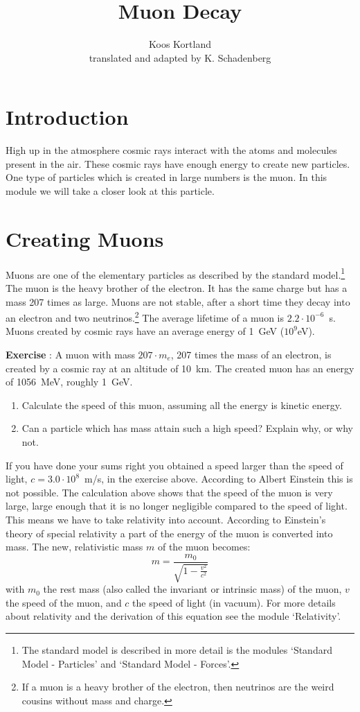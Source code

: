 \documentclass[12pt,a4paper]{article}
\author{Koos Kortland \\ translated and adapted by K. Schadenberg}
\date{}
\title{Muon Decay}
\numberwithin{equation}{section}
\numberwithin{figure}{section}
\newcounter{Exercise}
\numberwithin{table}{section}
\begin{document}
\maketitle

\section{Introduction}
High up in the atmosphere cosmic rays interact with the atoms and molecules present in the air. These cosmic rays have enough energy to create new particles. One type of particles which is created in large numbers is the muon. In this module we will take a closer look at this particle.

\section{Creating Muons}
Muons are one of the elementary particles as described by the standard model.\footnote{The standard model is described in more detail is the modules `Standard Model - Particles' and `Standard Model - Forces'.} The muon is the heavy brother of the electron. It has the same charge but has a mass 207 times as large. Muons are not stable, after a short time they decay into an electron and two neutrinos.\footnote{If a muon is a heavy brother of the electron, then neutrinos are the weird cousins without mass and charge.} The average lifetime of a muon is $2.2 \cdot 10^{-6}$~s. Muons created by cosmic rays have an average energy of 1~GeV ($10^9$eV).

\begin{shaded}
\textbf{Exercise \theExercise {}} : A muon with mass $207 \cdot m_e$, 207 times the mass of an electron, is created by a cosmic ray at an altitude of 10~km. The created muon has an energy of 1056~MeV, roughly 1~GeV. \\
\begin{enumerate}[-]
\item Calculate the speed of this muon, assuming all the energy is kinetic energy.
\item  Can a particle which has mass attain such a high speed? Explain why, or why not.
\end{enumerate}\end{shaded}

If you have done your sums right you obtained a speed larger than the speed of light, $c = 3.0 \cdot 10^8$~m/s,  in the exercise above. According to Albert Einstein this is not possible. The calculation above shows that the speed of the muon is very large, large enough that it is no longer negligible compared to the speed of light. This means we have to take relativity into account. According to Einstein's theory of special relativity a part of the energy of the muon is converted into mass. The new, relativistic mass $m$ of the muon becomes:
\begin{equation}
m = \frac{m_0}{\sqrt{1-\frac{v^2}{c^2}}}
\end{equation}
with $m_0$ the rest mass (also called the invariant or intrinsic mass) of the muon, $v$ the speed of the muon, and $c$ the speed of light (in vacuum). For more details about relativity and the derivation of this equation see the module `Relativity'.
\end{document}
